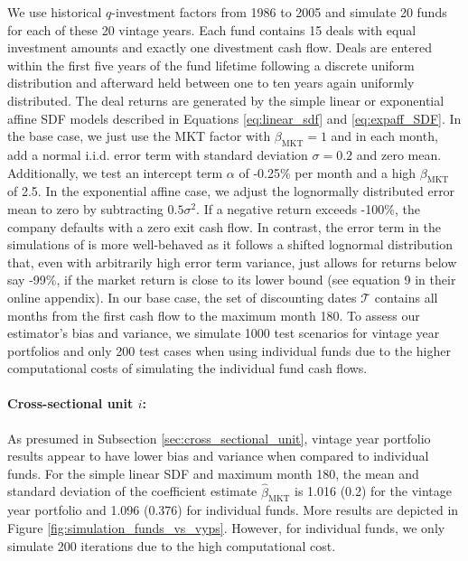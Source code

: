 \documentclass[12pt]{article}
\begin{document}
We use historical $q$-investment factors from 1986 to 2005 and simulate 20 funds for each of these 20 vintage years.
Each fund contains 15 deals with equal investment amounts and exactly one divestment cash flow.
Deals are entered within the first five years of the fund lifetime following a discrete uniform distribution and afterward held between one to ten years again uniformly distributed.
The deal returns are generated by the simple linear or exponential affine SDF models described in Equations \ref{eq:linear_sdf} and \ref{eq:expaff_SDF}.
In the base case, we just use the MKT factor with $\beta_{\mathrm{MKT}}=1$ and in each month, add a normal i.i.d. error term with standard deviation $\sigma=0.2$ and zero mean.
Additionally, we test an intercept term $\alpha$ of -0.25\% per month and a high $\beta_{\mathrm{MKT}}$ of 2.5.
In the exponential affine case, we adjust the lognormally distributed error mean to zero by subtracting $0.5 \sigma^2$.
If a negative return exceeds -100\%, the company defaults with a zero exit cash flow.
In contrast, the error term in the simulations of \cite{DLP12} is more well-behaved as it follows a shifted lognormal distribution that, even with arbitrarily high error term variance, just allows for returns below say -99\%, if the market return is close to its lower bound (see equation 9 in their online appendix).
In our base case, the set of discounting dates $\mathcal{T}$ contains all months from the first cash flow to the maximum month 180.
To assess our estimator's bias and variance, we simulate 1000 test scenarios for vintage year portfolios and only 200 test cases when using individual funds due to the higher computational costs of simulating the individual fund cash flows.


\paragraph{Cross-sectional unit $i$:}

As presumed in Subsection \ref{sec:cross_sectional_unit}, vintage year portfolio results appear to have lower bias and variance when compared to individual funds.
For the simple linear SDF and maximum month 180, the mean and standard deviation of the coefficient estimate $\hat{\beta}_{\mathrm{MKT}}$ is 1.016 (0.2) for the vintage year portfolio and 1.096 (0.376) for individual funds. 
More results are depicted in Figure \ref{fig:simulation_funds_vs_vyps}.
However, for individual funds, we only simulate 200 iterations due to the high computational cost.
\end{document}

